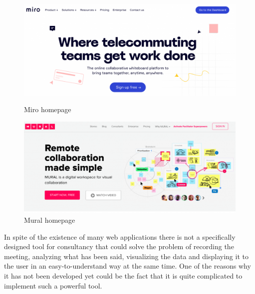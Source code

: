 \documentclass{article}
\begin{document}
\begin{figure}[H]
\centering
\begin{minipage}{.5\textwidth}
  \centering
  \includegraphics[width=1\linewidth]{img/miro.png}
  \caption{Miro homepage}
  \label{fig:miro}
\end{minipage}%
\begin{minipage}{.5\textwidth}
  \centering
  \includegraphics[width=1\linewidth]{img/mural.png}
  \caption{Mural homepage}
  \label{fig:mural}
\end{minipage}
\end{figure}

{\large
In spite of the existence of many web applications there is not a specifically designed tool for consultancy that could solve the problem of recording the meeting, analyzing what has been said, visualizing the data and displaying it to the user in an easy-to-understand way at the same time. One of the reasons why it has not been developed yet could be the fact that it is quite complicated to implement such a powerful tool.
}
\end{document}
